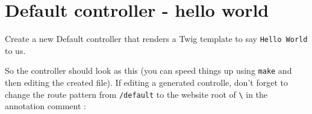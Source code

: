 \documentclass[a4paperpaper,openright]{book}
\newenvironment{Shaded}{}{}
\newcommand{\AnnotationTok}[1]{\textcolor[rgb]{0.38,0.63,0.69}{\textbf{\textit{#1}}}}
\newcommand{\CommentTok}[1]{\textcolor[rgb]{0.38,0.63,0.69}{\textit{#1}}}
\newcommand{\ExtensionTok}[1]{#1}
\newcommand{\KeywordTok}[1]{\textcolor[rgb]{0.00,0.44,0.13}{\textbf{#1}}}
\newcommand{\NormalTok}[1]{#1}
\newcommand{\OtherTok}[1]{\textcolor[rgb]{0.00,0.44,0.13}{#1}}
\newcommand{\StringTok}[1]{\textcolor[rgb]{0.25,0.44,0.63}{#1}}
\begin{document}
\begin{Shaded}
\end{Shaded}

\hypertarget{default-controller---hello-world}{%
\section{Default controller - hello
world}\label{default-controller---hello-world}}

Create a new Default controller that renders a Twig template to say
\texttt{Hello\ World} to us.

So the controller should look as this (you can speed things up using
\texttt{make} and then editing the created file). If editing a generated
controlle, don't forget to change the route pattern from
\texttt{/default} to the website root of \texttt{\textbackslash{}} in
the annotation comment :

\begin{Shaded}
\end{Shaded}
\end{document}
